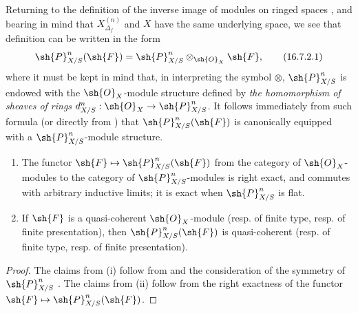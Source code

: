 \begin{env}[16.7.2]
\label{IV.16.7.2}
Returning to the definition of the inverse image of modules on ringed spaces , and bearing in mind that $X_{\Delta_f}^{(n)}$ and $X$ have the same underlying space, we see that definition  can be written in the form
\[
  \label{IV.16.7.2.1}
  \sh{P}_{X/S}^n(\sh{F}) = \sh{P}_{X/S}^n \otimes_{\sh{O}_X} \sh{F},
  \tag{16.7.2.1}
\]
where it must be kept in mind that, in interpreting the symbol $\otimes$, $\sh{P}_{X/S}^n$ is endowed with the $\sh{O}_X$-module structure defined by \emph{the homomorphism of sheaves of rings $d_{X/S}^n:\sh{O}_X \to \sh{P}_{X/S}^n$}.
It follows immediately from such formula (or directly from ) that $\sh{P}_{X/S}^n(\sh{F})$ is canonically equipped with a $\sh{P}_{X/S}^n$-module structure. 
\end{env}

\begin{proposition}[16.7.3]
\label{IV.16.7.3}
\begin{enumerate}
  \item[\rm{(i)}] The functor $\sh{F} \mapsto \sh{P}_{X/S}^n(\sh{F})$ from the category of $\sh{O}_X$-modules to the category of $\sh{P}_{X/S}^n$-modules is right exact, and commutes with arbitrary inductive limits;
  it is exact when $\sh{P}_{X/S}^n$ is flat.
  \item[\rm{(ii)}] If $\sh{F}$ is a quasi-coherent $\sh{O}_X$-module (resp. of finite type, resp. of finite presentation), then $\sh{P}_{X/S}^n(\sh{F})$ is quasi-coherent (resp. of finite type, resp. of finite presentation).
\end{enumerate}
\end{proposition}

\begin{proof}
The claims from \rm{(i)} follow from  and the consideration of the symmetry of $\sh{P}_{X/S}^n$ .
The claims from \rm{(ii)} follow from the right exactness of the functor $\sh{F} \mapsto \sh{P}_{X/S}^n(\sh{F})$.
\end{proof}

